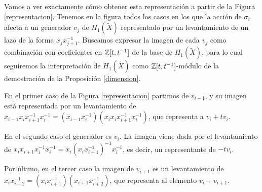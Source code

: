 \documentclass[TFG.tex]{subfiles}
\begin{document}
Vamos a ver exactamente cómo obtener esta representación a partir de la Figura \ref{representacion}. Tenemos en la figura todos los casos en los que la acción de $\sigma_i$ afecta a un generador $v_j$ de $H_1(\widetilde{X})$ representado por un levantamiento de un lazo de la forma $x_jx_{j+1}^{-1}$. Buscamos expresar la imagen de cada $v_j$ como combinación con coeficientes en $\mathbb{Z}[t,t^{-1}]$ de la base de $H_1(\widetilde{X})$, para lo cual seguiremos la interpretación de $H_1(\widetilde{X})$ como $\mathbb{Z}[t,t^{-1}]$-módulo de la demostración de la Proposición \ref{dimension}. 
%

En el primer caso de la Figura \ref{representacion} partimos de $v_{i-1}$, y su imagen está representada por un levantamiento de $x_{i-1}x_ix_{i+1}^{-1}x_i^{-1}=(x_{i-1}x_i^{-1})(x_ix_ix_{i+1}^{-1}x_i^{-1})$, que representa a $v_i+tv_i$. 

En el segundo caso el generador es $v_i$. La imagen viene dada por el levantamiento de $x_ix_{i+1}x_i^{-1}x_i^{-1}=x_i(x_ix_{i+1}^{-1})^{-1}x_i^{-1}$, es decir, un representante de $-tv_i$. 

Por último, en el tercer caso la imagen de $v_{i+1}$ es un levantamiento de $x_ix_{i+2}^{-1}=(x_ix_{i+1}^{-1})(x_{i+1}x_{i+2}^{-1})$, que representa al elemento $v_i+v_{i+1}$.
\end{document}
